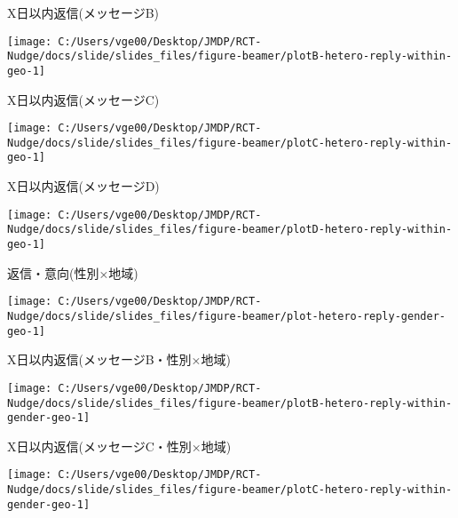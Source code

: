 \documentclass[
      aspectratio=169,
        12pt,
    ]{beamer}
\begin{document}
\begin{frame}{X日以内返信(メッセージB)}
\protect\hypertarget{xux65e5ux4ee5ux5185ux8fd4ux4fe1ux30e1ux30c3ux30bbux30fcux30b8b}{}
\begin{center}\texttt{[image: C:/Users/vge00/Desktop/JMDP/RCT-Nudge/docs/slide/slides\_files/figure-beamer/plotB-hetero-reply-within-geo-1]} \end{center}
\end{frame}

\begin{frame}{X日以内返信(メッセージC)}
\protect\hypertarget{xux65e5ux4ee5ux5185ux8fd4ux4fe1ux30e1ux30c3ux30bbux30fcux30b8c}{}
\begin{center}\texttt{[image: C:/Users/vge00/Desktop/JMDP/RCT-Nudge/docs/slide/slides\_files/figure-beamer/plotC-hetero-reply-within-geo-1]} \end{center}
\end{frame}

\begin{frame}{X日以内返信(メッセージD)}
\protect\hypertarget{xux65e5ux4ee5ux5185ux8fd4ux4fe1ux30e1ux30c3ux30bbux30fcux30b8d}{}
\begin{center}\texttt{[image: C:/Users/vge00/Desktop/JMDP/RCT-Nudge/docs/slide/slides\_files/figure-beamer/plotD-hetero-reply-within-geo-1]} \end{center}
\end{frame}

\begin{frame}{返信・意向(性別×地域)}
\protect\hypertarget{ux8fd4ux4fe1ux610fux5411ux6027ux5225ux5730ux57df}{}
\begin{center}\texttt{[image: C:/Users/vge00/Desktop/JMDP/RCT-Nudge/docs/slide/slides\_files/figure-beamer/plot-hetero-reply-gender-geo-1]} \end{center}
\end{frame}

\begin{frame}{X日以内返信(メッセージB・性別×地域)}
\protect\hypertarget{xux65e5ux4ee5ux5185ux8fd4ux4fe1ux30e1ux30c3ux30bbux30fcux30b8bux6027ux5225ux5730ux57df}{}
\begin{center}\texttt{[image: C:/Users/vge00/Desktop/JMDP/RCT-Nudge/docs/slide/slides\_files/figure-beamer/plotB-hetero-reply-within-gender-geo-1]} \end{center}
\end{frame}

\begin{frame}{X日以内返信(メッセージC・性別×地域)}
\protect\hypertarget{xux65e5ux4ee5ux5185ux8fd4ux4fe1ux30e1ux30c3ux30bbux30fcux30b8cux6027ux5225ux5730ux57df}{}
\begin{center}\texttt{[image: C:/Users/vge00/Desktop/JMDP/RCT-Nudge/docs/slide/slides\_files/figure-beamer/plotC-hetero-reply-within-gender-geo-1]} \end{center}
\end{frame}
\end{document}
